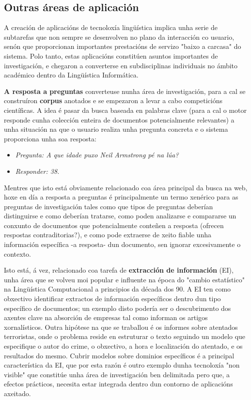 \begin{multicols}{2}
\subsection{Outras áreas de aplicación}

   A creación de aplicacións de tecnoloxía lingüística implica unha serie de subtarefas que non sempre se desenvolven no plano da interacción co usuario, senón que proporcionan importantes prestacións de servizo "baixo a carcasa" do sistema. Polo tanto, estas aplicacións constitúen asuntos importantes de investigación, e chegaron a converterse en subdisciplinas individuais no ámbito académico dentro da Lingüística Informática. 

\textbf{A resposta a preguntas} converteuse nunha área de investigación, para a cal se construíron \textbf{corpus} anotados e se empezaron a levar a cabo competicións científicas. A idea é pasar da busca baseada en palabras clave (para a cal o motor responde cunha colección enteira de documentos potencialmente relevantes) a unha situación na que o usuario realiza unha pregunta concreta e o sistema proporciona unha soa resposta:

\begin{itemize}
\item[] \textit{Pregunta: A que idade puxo Neil Armstrong pé na lúa?}
\item[] \textit{Responder: 38.}
\end{itemize}

Mentres que isto está obviamente relacionado coa área principal da busca na web, hoxe en día a resposta a preguntas é principalmente un termo xenérico para as preguntas de investigación tales como que tipos de preguntas deberían distinguirse e como deberían tratarse, como poden analizarse e compararse un conxunto de documentos que potencialmente conteñen a resposta (ofrecen respostas contraditorias?), e como pode extraerse de xeito fiable unha información específica -a resposta- dun documento, sen ignorar excesivamente o contexto. 

Isto está, á vez, relacionado coa tarefa de \textbf{extracción de información} (EI), unha área que se volveu moi popular e influente na época do "cambio estatístico" na Lingüística Computacional a principios da década dos 90. A EI ten como obxectivo identificar extractos de información específicos dentro dun tipo específico de documentos; un exemplo disto podería ser o descubrimento dos axentes clave na absorción de empresas tal como informan os artigos xornalísticos. Outra hipótese na que se traballou é os informes sobre atentados terroristas, onde o problema reside en estruturar o texto seguindo un modelo que especifique o autor do crime, o obxectivo, a hora e localización do atentado, e os resultados do mesmo. Cubrir modelos sobre dominios específicos é a principal característica da EI, que por esta razón é outro exemplo dunha tecnoloxía "non visible" que constitúe unha área de investigación ben delimitada pero que, a efectos prácticos, necesita estar integrada dentro dun contorno de aplicacións axeitado. 


\end{multicols}
